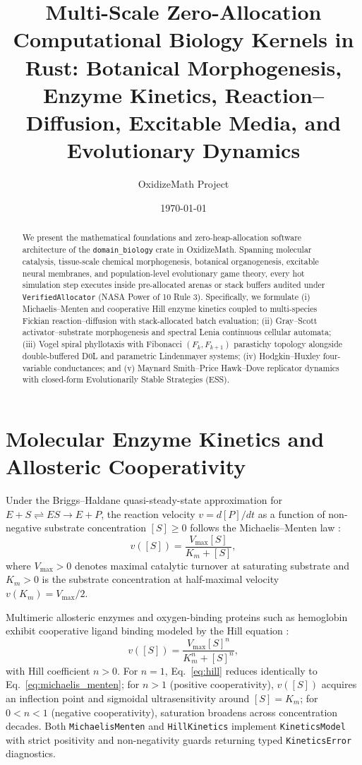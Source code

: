 \documentclass[12pt]{article}
\title{Multi-Scale Zero-Allocation Computational Biology Kernels in Rust: Botanical Morphogenesis, Enzyme Kinetics, Reaction--Diffusion, Excitable Media, and Evolutionary Dynamics}
\author{OxidizeMath Project}
\date{\today}
\begin{document}
\maketitle

\begin{abstract}
We present the mathematical foundations and zero-heap-allocation software architecture of the \texttt{domain\_biology} crate in OxidizeMath. Spanning molecular catalysis, tissue-scale chemical morphogenesis, botanical organogenesis, excitable neural membranes, and population-level evolutionary game theory, every hot simulation step executes inside pre-allocated arenas or stack buffers audited under \texttt{VerifiedAllocator} (NASA Power of 10 Rule 3). Specifically, we formulate (i) Michaelis--Menten and cooperative Hill enzyme kinetics coupled to multi-species Fickian reaction--diffusion with stack-allocated batch evaluation; (ii) Gray--Scott activator--substrate morphogenesis and spectral Lenia continuous cellular automata; (iii) Vogel spiral phyllotaxis with Fibonacci $(F_k, F_{k+1})$ parastichy topology alongside double-buffered D0L and parametric Lindenmayer systems; (iv) Hodgkin--Huxley four-variable conductances; and (v) Maynard Smith--Price Hawk--Dove replicator dynamics with closed-form Evolutionarily Stable Strategies (ESS).
\end{abstract}

\section{Molecular Enzyme Kinetics and Allosteric Cooperativity}

Under the Briggs--Haldane quasi-steady-state approximation for $E + S \rightleftharpoons ES \rightarrow E + P$, the reaction velocity $v = d[P]/dt$ as a function of non-negative substrate concentration $[S] \ge 0$ follows the Michaelis--Menten law \cite{michaelis1913kinetik}:
\begin{equation}
v([S]) = \frac{V_{\max} [S]}{K_m + [S]},
\label{eq:michaelis_menten}
\end{equation}
where $V_{\max} > 0$ denotes maximal catalytic turnover at saturating substrate and $K_m > 0$ is the substrate concentration at half-maximal velocity $v(K_m) = V_{\max}/2$.

Multimeric allosteric enzymes and oxygen-binding proteins such as hemoglobin exhibit cooperative ligand binding modeled by the Hill equation \cite{hill1910possible}:
\begin{equation}
v([S]) = \frac{V_{\max} [S]^n}{K_m^n + [S]^n},
\label{eq:hill}
\end{equation}
with Hill coefficient $n > 0$. For $n = 1$, Eq.~\eqref{eq:hill} reduces identically to Eq.~\eqref{eq:michaelis_menten}; for $n > 1$ (positive cooperativity), $v([S])$ acquires an inflection point and sigmoidal ultrasensitivity around $[S] = K_m$; for $0 < n < 1$ (negative cooperativity), saturation broadens across concentration decades. Both \texttt{MichaelisMenten} and \texttt{HillKinetics} implement \texttt{KineticsModel} with strict positivity and non-negativity guards returning typed \texttt{KineticsError} diagnostics.
\end{document}

